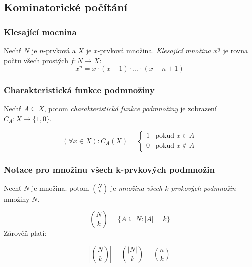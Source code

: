 \documentclass[10pt,a4paper]{article}
\begin{document}
\subsection{Kominatorické počítání}

\subsubsection{Klesající mocnina}

Nechť $N$ je $n$-prvková a $X$ je $x$-prvková množina. \textit{Klesající množina} $x^{\underline{n}}$ je rovna počtu všech prostých $f:N \to X$:
\[x^{\underline{n}} = x\cdot (x-1) \cdot ... \cdot (x-n+1)\]

\subsubsection{Charakteristická funkce podmnožiny}

Nechť $A \subseteq X$, potom \textit{charakteristická funkce podmnožiny} je zobrazení $C_A: X \to \{1,0\}$.

\[
    (\forall x\in X): C_A(X) = 
    \begin{cases}
        1 & \text{pokud } x \in A\\
        0 & \text{pokud } x \notin A
    \end{cases}
\]


\subsubsection{Notace pro množinu všech k-prvkových podmnožin}
Nechť $N$ je množina. potom $\binom Nk$ je \textit{množina všech $k$-prvkových podmnožin} množiny $N$.

\[
    \binom{N}{k} = \{A\subseteq N: |A| = k\}
\]
Zárověň platí:

\[
    \left | \binom{N}{k} \right | = \binom{|N|}{k}= \binom{n}{k}
\]

\end{document}
